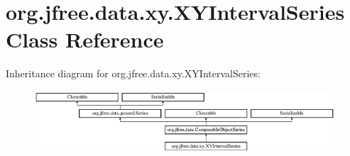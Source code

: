 \hypertarget{classorg_1_1jfree_1_1data_1_1xy_1_1_x_y_interval_series}{}\section{org.\+jfree.\+data.\+xy.\+X\+Y\+Interval\+Series Class Reference}
\label{classorg_1_1jfree_1_1data_1_1xy_1_1_x_y_interval_series}
Inheritance diagram for org.\+jfree.\+data.\+xy.\+X\+Y\+Interval\+Series\+:\begin{figure}[H]
\begin{center}
\leavevmode
\includegraphics[height=2.314049cm]{classorg_1_1jfree_1_1data_1_1xy_1_1_x_y_interval_series}
\end{center}
\end{figure}
